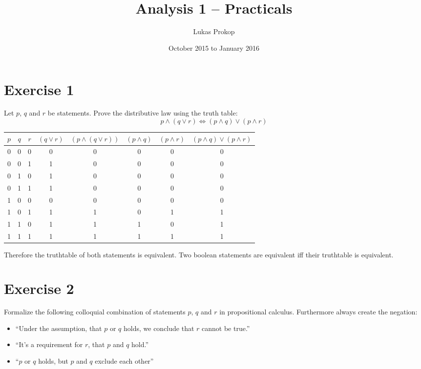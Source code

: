 \documentclass[a4paper]{article}
\title{Analysis 1 -- Practicals}
\author{Lukas Prokop}
\date{October 2015 to January 2016}
\theoremstyle{definition}
\begin{document}
\maketitle
\tableofcontents

\clearpage
\section{Exercise 1}
\begin{ex}
  Let $p$, $q$ and $r$ be statements. Prove the distributive law using the truth table:
  \[ p \land (q \lor r) \Leftrightarrow (p \land q) \lor (p \land r) \]
\end{ex}

\begin{table}[!h]
  \begin{center}
    \begin{tabular}{ccc|cc|ccc}
        $p$ & $q$ & $r$ & $(q \lor r)$ & $(p \land (q \lor r))$ & $(p \land q)$ & $(p \land r)$ & $(p \land q) \lor (p \land r)$ \\
      \hline
        0 & 0 & 0       & 0 & 0                                 & 0 & 0 & 0 \\
        0 & 0 & 1       & 1 & 0                                 & 0 & 0 & 0 \\
        0 & 1 & 0       & 1 & 0                                 & 0 & 0 & 0 \\
        0 & 1 & 1       & 1 & 0                                 & 0 & 0 & 0 \\
        1 & 0 & 0       & 0 & 0                                 & 0 & 0 & 0 \\
        1 & 0 & 1       & 1 & 1                                 & 0 & 1 & 1 \\
        1 & 1 & 0       & 1 & 1                                 & 1 & 0 & 1 \\
        1 & 1 & 1       & 1 & 1                                 & 1 & 1 & 1
    \end{tabular}
  \end{center}
\end{table}

Therefore the truthtable of both statements is equivalent.
Two boolean statements are equivalent iff their truthtable is equivalent.

\section{Exercise 2}
\begin{ex}
  Formalize the following colloquial combination of statements $p$, $q$ and $r$
  in propositional calculus. Furthermore always create the negation:
  \begin{itemize}
    \item \enquote{Under the assumption, that $p$ or $q$ holds, we conclude that $r$ cannot be true.}
    \item \enquote{It's a requirement for $r$, that $p$ and $q$ hold.}
    \item \enquote{$p$ or $q$ holds, but $p$ and $q$ exclude each other}
  \end{itemize}
\end{ex}
\end{document}
